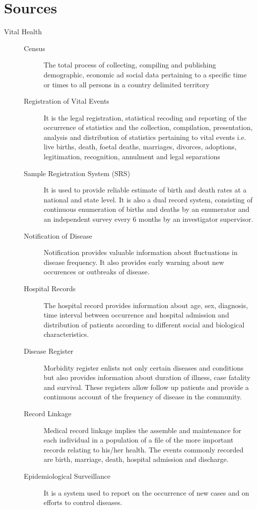 \documentclass[
10pt, %
a4paper, %
]{report}
\begin{document}
\section{Sources}
\begin{description}
\item[Vital Health]
\begin{description}
\item[]
\item[Census] The total process of collecting, compiling and publishing demographic, economic ad social data pertaining to a specific time or times to all persons in a country delimited territory
\item[Registration of Vital Events] It is the legal registration, statistical recoding and reporting of the occurrence of statistics and the collection, compilation, presentation, analysis and distribution of statistics pertaining to vital events i.e. live births, death, foetal deaths, marriages, divorces, adoptions, legitimation, recognition, annulment and legal separations
\item[Sample Registration System (SRS)] It is used to provide reliable estimate of birth and death rates at a national and state level. It is also a dual record system, consisting of continuous enumeration of births and deaths by an enumerator and an independent survey every 6 months by an investigator supervisor.
\item[Notification of Disease] Notification provides valuable information about fluctuations in disease frequency. It also provides early warning about new occurences or outbreaks of disease.
\item[Hospital Records] The hospital record provides information about age, sex, diagnosis, time interval between occurrence and hospital admission and distribution of patients according to different social and biological characteristics.
\item[Disease Register] Morbidity register enlists not only certain diseases and conditions but also provides information about duration of illness, case fatality and survival. These registers allow follow up patients and provide a continuous account of the frequency of disease in the community.
\item[Record Linkage] Medical record linkage implies the assemble and maintenance for each individual in a population of a file of the more important records relating to his/her health. The events commonly recorded are birth, marriage, death, hospital admission and discharge.
\item[Epidemiological Surveillance] It is a system used to report on the occurrence of new cases and on efforts to control diseases.

\end{description}
\end{description}
\end{document}

